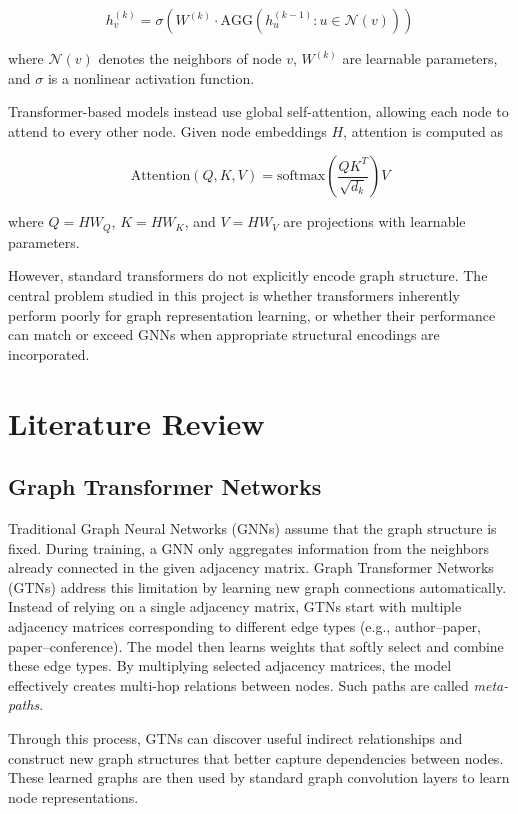 \documentclass[11pt]{article}
\begin{document}
$$
h_v^{(k)} = \sigma \left(
W^{(k)} \cdot
\text{AGG}\left({h_u^{(k-1)} : u \in \mathcal{N}(v)}\right)
\right)
$$

where $\mathcal{N}(v)$ denotes the neighbors of node $v$, $W^{(k)}$ are learnable parameters, and $\sigma$ is a nonlinear activation function.

Transformer-based models instead use global self-attention, allowing each node to attend to every other node. Given node embeddings $H$, attention is computed as

$$
\text{Attention}(Q,K,V) =
\text{softmax}\left(\frac{QK^T}{\sqrt{d_k}}\right)V
$$

where $Q = HW_Q$, $K = HW_K$, and $V = HW_V$ are projections with learnable parameters.

However, standard transformers do not explicitly encode graph structure. The central problem studied in this project is whether transformers inherently perform poorly for graph representation learning, or whether their performance can match or exceed GNNs when appropriate structural encodings are incorporated.



\section{Literature Review}

\subsection{Graph Transformer Networks \cite{gtn}}

Traditional Graph Neural Networks (GNNs) assume that the graph structure is fixed. 
During training, a GNN only aggregates information from the neighbors already 
connected in the given adjacency matrix.
Graph Transformer Networks (GTNs) address this limitation by learning new graph 
connections automatically. Instead of relying on a single adjacency matrix, GTNs 
start with multiple adjacency matrices corresponding to different edge types 
(e.g., author–paper, paper–conference). The model then learns weights that softly 
select and combine these edge types. By multiplying selected adjacency matrices, 
the model effectively creates multi-hop relations between nodes. Such paths are called \emph{meta-paths}. 

Through this process, GTNs can discover useful indirect relationships and 
construct new graph structures that better capture dependencies between nodes. 
These learned graphs are then used by standard graph convolution layers to learn 
node representations.
\end{document}
